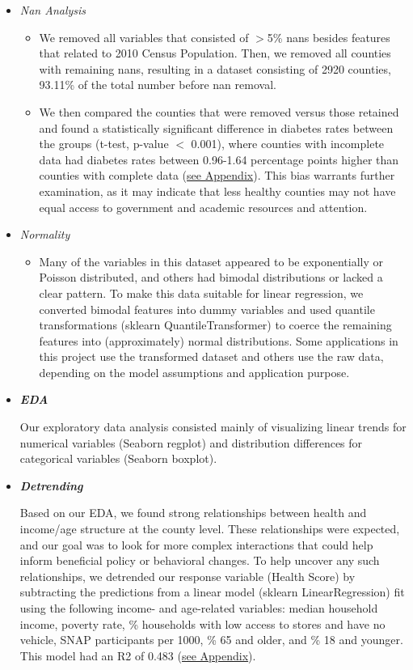 \documentclass{article}
\begin{document}
\begin{itemize}[leftmargin=0pt]
\begin{itemize}
\item[] \textit{Nan Analysis}
\begin{itemize}
    \item[] We removed all variables that consisted of $>$5\% nans besides features that related to 2010 Census Population. Then, we removed all counties with remaining nans, resulting in a dataset consisting of 2920 counties, 93.11\% of the total number before nan removal. 
    \item[] We then compared the counties that were removed versus those retained and found a statistically significant difference in diabetes rates between the groups (t-test, p-value $<$ 0.001), where counties with incomplete data had diabetes rates between 0.96-1.64 percentage points higher than counties with complete data (\hyperref[fig:nan_bias]{see Appendix}). This bias warrants further examination, as it may indicate that less healthy counties may not have equal access to government and academic resources and attention.
\end{itemize}

\item[] \textit{Normality}
\begin{itemize}
    \item[] Many of the variables in this dataset appeared to be exponentially or Poisson distributed, and others had bimodal distributions or lacked a clear pattern. To make this data suitable for linear regression, we converted bimodal features into dummy variables and used quantile transformations (sklearn QuantileTransformer) to coerce the remaining features into (approximately) normal distributions. Some applications in this project use the transformed dataset and others use the raw data, depending on the model assumptions and application purpose. 
\end{itemize}

\item[] \textbf{\textit{EDA}}

Our exploratory data analysis consisted mainly of visualizing linear trends for numerical variables (Seaborn regplot) and distribution differences for categorical variables (Seaborn boxplot). 

\item[] \textbf{\textit{Detrending}}

Based on our EDA, we found strong relationships between health and income/age structure at the county level. These relationships were expected, and our goal was to look for more complex interactions that could help inform beneficial policy or behavioral changes. To help uncover any such relationships, we detrended our response variable (Health Score) by subtracting the predictions from a linear model (sklearn LinearRegression) fit using the following income- and age-related variables: median household income, poverty rate, \% households with low access to stores and have no vehicle, SNAP participants per 1000, \% 65 and older, and \% 18 and younger. This model had an R2 of 0.483 (\hyperref[fig:detrend]{see Appendix}). 


\end{itemize}
\end{itemize}
\end{document}

